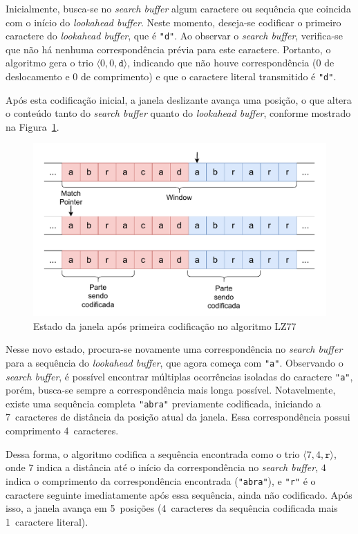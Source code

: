 Inicialmente, busca-se no \textit{search buffer} algum caractere ou sequência que coincida com o início do \textit{lookahead buffer}. Neste momento, deseja-se codificar o primeiro caractere do \textit{lookahead buffer}, que é \texttt{"d"}. Ao observar o \textit{search buffer}, verifica-se que não há nenhuma correspondência prévia para este caractere. Portanto, o algoritmo gera o trio $\langle 0, 0, \texttt{d} \rangle$, indicando que não houve correspondência ($0$ de deslocamento e $0$ de comprimento) e que o caractere literal transmitido é \texttt{"d"}.

Após esta codificação inicial, a janela deslizante avança uma posição, o que altera o conteúdo tanto do \textit{search buffer} quanto do \textit{lookahead buffer}, conforme mostrado na Figura~\ref{fig:Estado_1_LZ77}.

\begin{figure}[ht]
\centering
\caption{Estado da janela após primeira codificação no algoritmo LZ77}
\label{fig:Estado_1_LZ77}
\includegraphics[width=15cm]{figuras/DiagramasTCC-LZ77-Estado-1}
\end{figure}

Nesse novo estado, procura-se novamente uma correspondência no \textit{search buffer} para a sequência do \textit{lookahead buffer}, que agora começa com \texttt{"a"}. Observando o \textit{search buffer}, é possível encontrar múltiplas ocorrências isoladas do caractere \texttt{"a"}, porém, busca-se sempre a correspondência mais longa possível. Notavelmente, existe uma sequência completa \texttt{"abra"} previamente codificada, iniciando a 7~caracteres de distância da posição atual da janela. Essa correspondência possui comprimento 4~caracteres.

Dessa forma, o algoritmo codifica a sequência encontrada como o trio $\langle 7, 4, \texttt{r} \rangle$, onde $7$ indica a distância até o início da correspondência no \textit{search buffer}, $4$ indica o comprimento da correspondência encontrada (\texttt{"abra"}), e \texttt{"r"} é o caractere seguinte imediatamente após essa sequência, ainda não codificado. Após isso, a janela avança em 5~posições (4~caracteres da sequência codificada mais 1~caractere literal).


